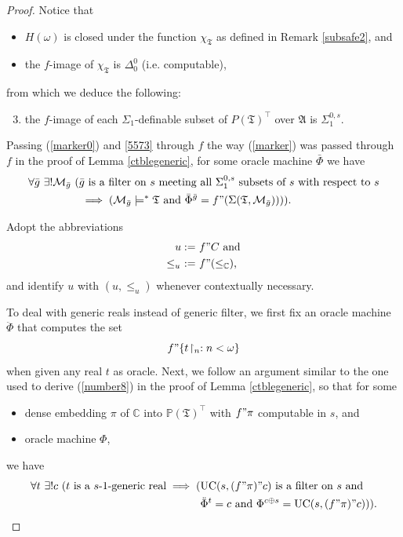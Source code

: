 \documentclass[12pt, twoside]{memoir}
\numberwithin{equation}{section}
\theoremstyle{definition}
\theoremstyle{remark}
\theoremstyle{definition}
\theoremstyle{definition}
\theoremstyle{definition}
\theoremstyle{remark}
\begin{document}
\begin{proof}
Notice that
\begin{itemize}
    \item $H(\omega)$ is closed under the function $\chi_{\mathfrak{T}}$ as defined in Remark \ref{subsafe2}, and 
    \item the $f$-image of $\chi_{\mathfrak{T}}$ is $\Delta^0_0$ (i.e. computable),
\end{itemize} 
from which we deduce the following:
\begin{enumerate}[label=(\Roman*)]
    \setcounter{enumi}{2}
    \item\label{5573} the $f$-image of each $\Sigma_1$-definable subset of $P(\mathfrak{T})^{\top}$ over $\mathfrak{A}$ is $\Sigma^{0, s}_1$.
\end{enumerate}

Passing (\ref{marker0}) and \ref{5573} through $f$ the way (\ref{marker}) was passed through $f$ in the proof of Lemma \ref{ctblegeneric}, for some oracle machine $\bar{\Phi}$ we have
\begin{align}\label{number9}
\begin{split}
    \forall \bar{g} \ \exists ! \mathcal{M}_{\bar{g}} \ ( & \bar{g} \text{ is a filter on } s \text{ meeting all } \Sigma^{0, s}_1 \text{ subsets of } s \text{ with respect to } s \\
    & \implies (\mathcal{M}_{\bar{g}} \models^* \mathfrak{T} \text{ and } \bar{\Phi}^{\bar{g}} = f" (\Sigma(\mathfrak{T}, \mathcal{M}_{\bar{g}})))) \text{.}
\end{split}
\end{align}

Adopt the abbreviations
\begin{align*}
    u := \ & f" C \text{ and} \\
    \leq_u \ := \ & f" (\leq_{\mathbb{C}}) \text{,}
\end{align*}
and identify $u$ with $(u, \leq_u)$ whenever contextually necessary. 

To deal with generic reals instead of generic filter, we first fix an oracle machine $\ddot{\Phi}$ that computes the set $$f" \{t \! \restriction_n : n < \omega\}$$ when given any real $t$ as oracle. Next, we follow an argument similar to the one used to derive (\ref{number8}) in the proof of Lemma \ref{ctblegeneric}, so that for some 
\begin{itemize}
    \item dense embedding $\pi$ of $\mathbb{C}$ into $\mathbb{P}(\mathfrak{T})^{\top}$ with $f" \pi$ computable in $s$, and 
    \item oracle machine $\Phi$, 
\end{itemize}
we have
\begin{align}\label{number10}
\begin{split}
    \forall t \ \exists ! c \ (t \text{ is a } s \text{-} 1 \text{-generic real} \implies ( & \mathrm{UC}(s, (f" \pi)" c) \text{ is a filter on } s \text{ and} \\
    & \ddot{\Phi}^t = c \text{ and } \Phi^{c \oplus s} = \mathrm{UC}(s, (f" \pi)" c))) \text{.}
\end{split}
\end{align}


\end{proof}
\end{document}
